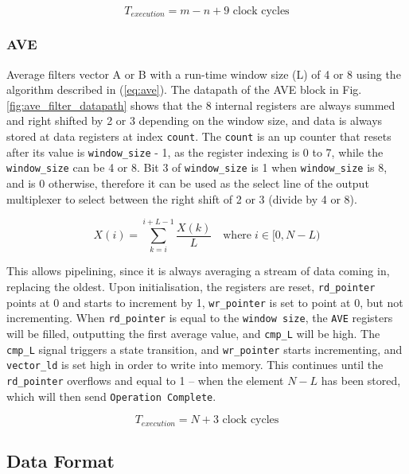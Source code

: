 \documentclass[]{article}
\begin{document}
	$$T_{execution} = m - n + 9 \text{ clock cycles}$$
	
	\subsubsection{AVE}
	Average filters vector A or B with a run-time window size (L) of 4 or 8 using the algorithm described in (\ref{eq:ave}). The datapath of the AVE block in Fig. \ref{fig:ave_filter_datapath} shows that the 8 internal registers are always summed and right shifted by 2 or 3 depending on the window size, and data is always stored at data registers at index \texttt{count}. The \texttt{count} is an up counter that resets after its value is \texttt{window\_size} - 1, as the register indexing is 0 to 7, while the \texttt{window\_size} can be 4 or 8. Bit 3 of \texttt{window\_size} is 1 when \texttt{window\_size} is 8, and is 0 otherwise, therefore it can be used as the select line of the output multiplexer to select between the right shift of 2 or 3 (divide by 4 or 8).
	
	\begin{equation} \label{eq:ave}
	X(i) = \sum_{k = i}^{i+L-1} \frac{X(k)}{L} \quad \text{where} \; i \in [0,N-L)
	\end{equation}    
	
	This allows pipelining, since it is always averaging a stream of data coming in, replacing the oldest. Upon initialisation, the registers are reset, \texttt{rd\_pointer} points at 0 and starts to increment by 1, \texttt{wr\_pointer} is set to point at 0, but not incrementing. When \texttt{rd\_pointer} is equal to the \texttt{window size}, the \texttt{AVE} registers will be filled, outputting the first average value, and \texttt{cmp\_L} will be high. The \texttt{cmp\_L} signal triggers a state transition, and \texttt{wr\_pointer} starts incrementing, and \texttt{vector\_ld} is set high in order to write into memory. This continues until the \texttt{rd\_pointer} overflows and equal to 1 -- when the element $N-L$ has been stored, which will then send \texttt{Operation Complete}.
	
	$$T_{execution} = N + 3 \text{ clock cycles}$$
	
	\subsection{Data Format}\label{sec:asp_data_format}
	
\end{document}
